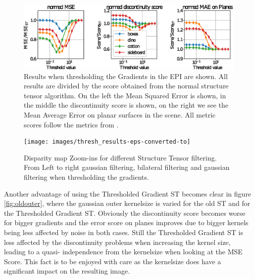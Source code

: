 \documentclass  [
  paper    = a4,
  BCOR     = 10mm,
  twoside,
  fontsize = 12pt,
  fleqn,
  toc      = bibnumbered,
  toc      = listofnumbered,
  numbers  = noendperiod,
  headings = normal,
  listof   = leveldown,
  version  = 3.03
]                                       {scrreprt}
\begin{document}
\begin{figure}
	\centering
	\includegraphics[width=1\linewidth]{images/thresh_params}
	\caption[Results when thresholding the Gradients in the EPI]{Results when thresholding the Gradients in the EPI are shown. All results are divided by the score obtained from the normal structure tensor algorithm. On the left the Mean Squared Error is shown, in the middle the discontinuity score is shown, on the right we see the Mean Average Error on planar surfaces in the scene. All metric scores follow the metrics from \cite{honauer2016benchmark}. }
	\label{fig:threshparams}
\end{figure}
\begin{figure}
	\centering
	\texttt{[image: images/thresh\_results-eps-converted-to]}
	\caption[Disparity map Zoom-ins for different methods]{Disparity map Zoom-ins for different Structure Tensor filtering. From Left to right gaussian filtering, bilateral filtering and gaussian filtering when thresholding the gradients.}
	\label{fig:threshresults}
\end{figure}

Another advantage of using the Thresholded Gradient ST becomes clear in figure \ref{fig:oldouter}, where the gaussian outer kernelsize is varied for the old ST and for the Thresholded Gradient ST. Obviously the discontinuity score becomes worse for bigger gradients and the error score on planes improves due to bigger kernels being less affected by noise in both cases. Still the Thresholded Gradient ST is less affected by the discontinuity problems when increasing the kernel size, leading to a quasi- independence from the kernelsize when looking at the MSE Score. This fact is to be enjoyed with care as the kernelsize does have a significant impact on the resulting image.
\end{document}
